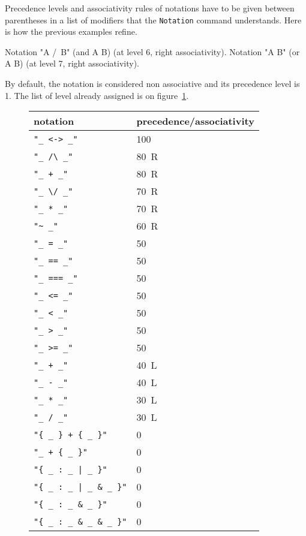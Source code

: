 Precedence levels and associativity rules of notations have to be
given between parentheses in a list of modifiers that the
\texttt{Notation} command understands. Here is how the previous
examples refine.

\begin{coq_example*}
Notation "A /\ B" (and A B) (at level 6, right associativity).
Notation "A \/ B" (or A B)  (at level 7, right associativity).
\end{coq_example*}

By default, the notation is considered non associative and its
precedence level is 1. The list of level already assigned
is on figure~\ref{coq-symbols}.

\begin{figure}
\label{coq-symbols}
\begin{tabular}{|l|l}
notation & precedence/associativity \\
\hline
\verb$"_ <-> _"$ & 100 \\
\verb$"_ /\ _"$ & 80\, R \\
\verb$"_ + _"$  & 80\, R \\
\verb$"_ \/ _"$ & 70\, R \\
\verb$"_ * _"$  & 70\, R \\
\verb$"~ _"$    & 60\, R \\
\verb$"_ = _"$  & 50 \\
\verb$"_ == _"$ & 50 \\
\verb$"_ === _"$ & 50 \\
\verb$"_ <= _"$ & 50 \\
\verb$"_ < _"$  & 50 \\
\verb$"_ > _"$  & 50 \\
\verb$"_ >= _"$ & 50 \\
\verb$"_ + _"$  & 40\, L \\
\verb$"_ - _"$  & 40\, L \\
\verb$"_ * _"$  & 30\, L \\
\verb$"_ / _"$  & 30\, L \\
\verb$"{ _ } + { _ }"$ & 0 \\
\verb$"_ + { _ }"$  & 0 \\
\verb$"{ _ : _ | _ }"$ & 0 \\
\verb$"{ _ : _ | _ & _ }"$ & 0 \\
\verb$"{ _ : _ & _ }"$ & 0 \\
\verb$"{ _ : _ & _ & _ }"$ & 0 \\
\hline
\end{tabular}
\end{figure}

